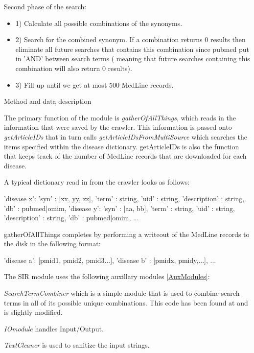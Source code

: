 Second phase of the search:

\begin{itemize}

\item 1) Calculate all possible combinations of the synonyms.

\item 2) Search for the combined synonym. If a combination returns 0 results then eliminate all future searches that contains this combination since pubmed put in 'AND' between search terms ( meaning that future searches containing this combination will also return 0 results).

\item 3) Fill up until we get at most 500 MedLine records.

\end{itemize}

Method and data description

The primary function of the module is \textit{gatherOfAllThings},
which reads in the information that were saved by the crawler. This
information is passed onto \textit{getArticleIDs} that in turn calls
\textit{getArticleIDsFromMultiSource} which searches the items
specified within the disease dictionary. getArticleIDs is also the
function that keeps track of the number of MedLine records that are
downloaded for each disease.

A typical dictionary read in from the crawler looks as follows:


{'disease x': {'syn' : [xx, yy, zz], 'term' : string, 'uid' : string,
    'description' : string, 'db' : pubmed|omim}, 'disease y': {'syn' :
    [aa, bb], 'term' : string, 'uid' : string, 'description' : string,
    'db' : pubmed|omim}, ...}

gatherOfAllThings completes by performing a writeout of the MedLine
records to the disk in the following format:

{'disease a': [pmid1, pmid2, pmid3...], 'disease b' : [pmidx,
    pmidy,...], ...}

The SIR module uses the following auxillary modules \ref{AuxModules}:

\textit{SearchTermCombiner} which is a simple module that is used to
combine search terms in all of its possible unique combinations. This
code has been found at \cite{} and is slightly
modified. 

\textit{IOmodule} handles Input/Output.

\textit{TextCleaner} is used to sanitize the input strings.

